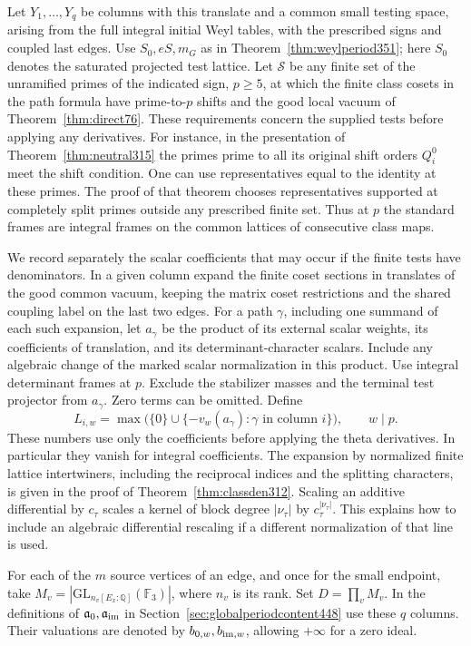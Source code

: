 \documentclass[a4paper,11pt]{article}
\theoremstyle{definition}
\theoremstyle{remark}
\numberwithin{equation}{section}
\begin{document}
Let \(Y_1,\ldots,Y_q\) be columns with this translate and a
common small testing space, arising from the full integral
initial Weyl tables, with the prescribed signs and coupled last
edges. Use \(S_0,eS,m_G\) as in Theorem~\ref{thm:weylperiod351};
here \(S_0\) denotes the saturated projected test lattice.
Let \(\mathcal S\) be any finite set of the unramified primes of
the indicated sign, \(p\ge5\), at which the finite class cosets
in the path formula have prime-to-\(p\) shifts and the good
local vacuum of Theorem~\ref{thm:direct76}. These requirements
concern the supplied tests before applying any derivatives.
For instance, in the presentation of Theorem~\ref{thm:neutral315}
the primes prime to all its original shift orders \(Q_i^0\)
meet the shift condition. One can use representatives equal to
the identity at these primes. The proof of that theorem chooses
representatives supported at completely split primes outside any
prescribed finite set. Thus at \(p\) the standard frames are
integral frames on the common lattices of consecutive class maps.

We record separately the scalar coefficients that may occur if
the finite tests have denominators. In a given column expand the
finite coset sections in translates of the good common vacuum,
keeping the matrix coset restrictions and the shared coupling
label on the last two edges. For a path \(\gamma\), including
one summand of each such expansion, let \(a_\gamma\) be the
product of its external scalar weights, its coefficients of
translation, and its determinant-character scalars. Include
any algebraic change of the marked scalar normalization in this
product. Use integral determinant frames at \(p\). Exclude the
stabilizer masses and the terminal test projector from \(a_\gamma\).
Zero terms can be omitted. Define
\[
 L_{i,w}=\max\big(\{0\}\cup
    \{-v_w(a_\gamma):\gamma\text{ in column }i\}\big),\qquad w\mid p .
\]
These numbers use only the coefficients before applying the
theta derivatives. In particular they vanish for integral
coefficients. The expansion by normalized finite lattice
intertwiners, including the reciprocal indices and the splitting
characters, is given in the proof of Theorem~\ref{thm:classden312}.
Scaling an additive differential by \(c_\tau\) scales a kernel
of block degree \(|\nu_\tau|\) by \(c_\tau^{|\nu_\tau|}\).
This explains how to include an algebraic differential rescaling
if a different normalization of that line is used.

For each of the \(m\) source vertices of an edge, and once for
the small endpoint, take \(M_v=|\mathrm{GL}_{n_v[E_x:\mathbb Q]}
(\mathbb F_3)|\), where \(n_v\) is its rank. Set \(D=\prod_v M_v\).
In the definitions of \(\mathfrak a_0,\mathfrak a_{\rm im}\)
in Section~\ref{sec:globalperiodcontent448} use these \(q\) columns.
Their valuations are denoted by \(b_{0,w},b_{{\rm im},w}\),
allowing \(+\infty\) for a zero ideal.
\end{document}
